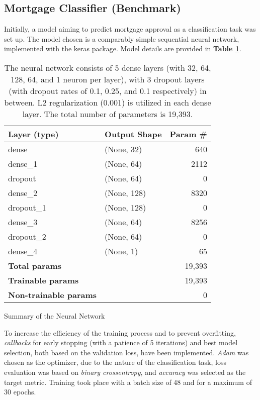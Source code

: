 
\subsection{Mortgage Classifier (Benchmark)}\label{subsec:Model_Training_and_Prediction}

Initially, a model aiming to predict mortgage approval as a classification task was set up. The model chosen is a comparably simple sequential neural network, implemented with the keras package. Model details are provided in \textbf{Table \ref{tab:CH03_Model_Details}}.

\begin{table}[h]
    \centering
    \begin{tabularx}{\textwidth}{lXr}
    \hline
    \textbf{Layer (type)} & \textbf{Output Shape} & \textbf{Param \#} \\
    \hline
    dense & (None, 32) & 640 \\
    dense\_1 & (None, 64) & 2112 \\
    dropout & (None, 64) & 0 \\
    dense\_2 & (None, 128) & 8320 \\
    dropout\_1 & (None, 128) & 0 \\
    dense\_3 & (None, 64) & 8256 \\
    dropout\_2 & (None, 64) & 0 \\
    dense\_4 & (None, 1) & 65 \\
    \hline
    \textbf{Total params} & & 19,393 \\
    \textbf{Trainable params} & & 19,393 \\
    \textbf{Non-trainable params} & & 0 \\
    \hline
    \end{tabularx}
    \caption{Summary of the Neural Network}
    \caption*{The neural network consists of 5 dense layers (with 32, 64, 128, 64, and 1 neuron per layer), with 3 dropout layers (with dropout rates of 0.1, 0.25, and 0.1 respectively) in between. L2 regularization (0.001) is utilized in each dense layer. The total number of parameters is 19,393.}
    \label{tab:CH03_Model_Details}
\end{table}

To increase the efficiency of the training process and to prevent overfitting, \textit{callbacks} for early stopping (with a patience of 5 iterations) and best model selection, both based on the validation loss, have been implemented. 
\textit{Adam} was chosen as the optimizer, due to the nature of the classification task, loss evaluation was based on \textit{binary crossentropy}, and \textit{accuracy} was selected as the target metric. Training took place with a batch size of 48 and for a maximum of 30 epochs. 


